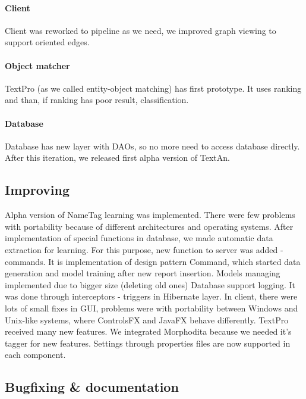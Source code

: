 \paragraph{Client} Client was reworked to pipeline as we need, we improved graph viewing to support oriented edges.
\paragraph{Object matcher} TextPro (as we called entity-object matching) has first prototype. It uses ranking and than, if ranking has poor result, classification.
\paragraph{Database} Database has new layer with DAOs, so no more need to access database directly.
After this iteration, we released first alpha version of TextAn.

\subsection{Improving}
Alpha version of NameTag learning was implemented. There were few problems with portability because of different architectures and operating systems. After implementation of special functions in database, we made automatic data extraction for learning. For this purpose, new function to server was added - commands. It is implementation of design pattern Command, which started data generation and model training after new report insertion. Models managing implemented due to bigger size (deleting old ones) 
Database support logging. It was done through interceptors - triggers in Hibernate layer.
In client, there were lots of small fixes in GUI, problems were with portability between Windows and Unix-like systems, where ControlsFX and JavaFX behave differently.
TextPro received many new features. We integrated Morphodita because we needed it's tagger for new features.
Settings through properties files are now supported in each component.

\subsection{Bugfixing \& documentation}
